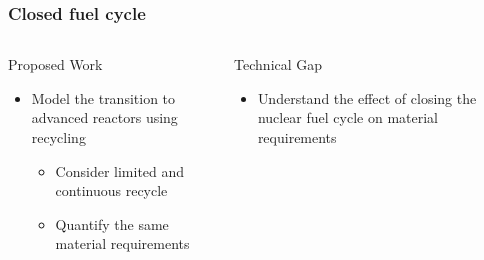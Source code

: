 \begin{frame}
  \frametitle{Closed fuel cycle}
        \begin{columns}
        \column[t]{3.5cm}
        \begin{block}{Proposed Work}
                \begin{itemize}
                        \item Model the transition to advanced reactors using recycling
                        \begin{itemize}
                                \item Consider limited and continuous recycle
                                \item Quantify the same material requirements 
                        \end{itemize}
                \end{itemize}
        \end{block}
        \begin{block}{Technical Gap}
             \begin{itemize}
                \item Understand the effect of closing the nuclear fuel 
                      cycle on material requirements
             \end{itemize}                   
        \end{block}
        
        \column[t]{6.5cm}
        
        \end{columns}
\end{frame}

